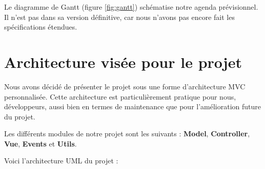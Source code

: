 \documentclass{article}
\begin{document}
Le diagramme de Gantt (figure \ref{fig:gantt}) schématise notre agenda prévisionnel. Il n'est pas dans sa version définitive, car nous n'avons
pas encore fait les spécifications étendues.

\section{Architecture visée pour le projet}
Nous avons décidé de présenter le projet sous une forme d'architecture MVC personnalisée. Cette architecture est particulièrement pratique pour nous, développeurs, aussi bien en termes de maintenance que pour l'amélioration future du projet.

Les différents modules de notre projet sont les suivants : \textbf{Model}, \textbf{Controller}, \textbf{Vue}, \textbf{Events} et \textbf{Utils}. 

Voici l'architecture UML du projet : 
\end{document}
